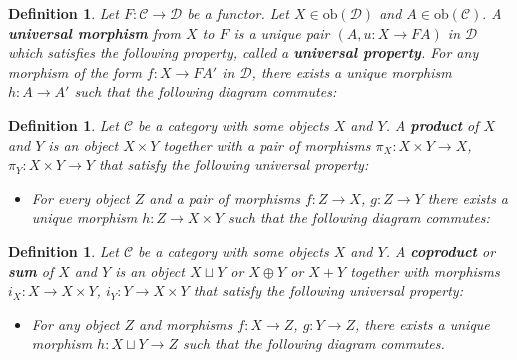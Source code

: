\documentclass[11pt]{report}
\newcommand{\mcC}{\mathcal{C}}
\newcommand{\mcD}{\mathcal{D}}
\newcommand{\ob}{\text{ob}}
\newtheorem{defn}[thm]{Definition} %
\begin{document}
\begin{defn}
  Let $F: \mcC \to \mcD$ be a functor. Let $X \in \ob(\mcD)$ and $A \in \ob(\mcC).$ A \textbf{universal morphism} from $X$ to $F$ is a unique pair
  $(A, u: X \to FA)$ in $\mcD$ which satisfies the following property, called a \textbf{universal property}.
  For any morphism of the form $f: X \to FA'$ in $\mcD$, there exists a unique morphism $h: A \to A'$ such that the following diagram commutes:
  \begin{center}
  \end{center}
\end{defn}

\begin{defn}
  Let $\mcC$ be a category with some objects $X$ and $Y$. A \textbf{product} of $X$ and $Y$ is an object $X \times Y$ together with a pair of morphisms
  $\pi_X: X \times Y\to X$, $\pi_Y: X \times Y\to Y$ that satisfy the following universal property:
  \begin{itemize}
  \item For every object $Z$ and a pair of morphisms $f: Z \to X$, $g: Z \to Y$ there exists a unique morphism $h: Z \to X \times Y$ such that
    the following diagram commutes:
    \begin{center}
    \end{center}
  \end{itemize}
\end{defn}

\begin{defn}
  Let $\mcC$ be a category with some objects $X$ and $Y$. A \textbf{coproduct} or \textbf{sum} of $X$ and $Y$ is an object $X \sqcup Y$ or $X \oplus Y$ or $X + Y$
  together with morphisms $i _X: X \to X \times Y$, $i_Y: Y \to X \times Y$ that satisfy the following universal property:
  \begin{itemize}
    \item For any object $Z$ and morphisms $f: X \to Z$, $g: Y \to Z$, there exists a unique morphism $h: X \sqcup Y \to Z$ such that the following diagram commutes.
    \begin{center}
    \end{center}
  \end{itemize}
\end{defn}
\end{document}
